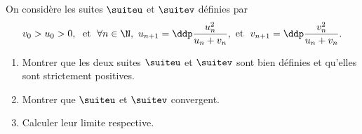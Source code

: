 \begin{exercice}
On consid\`ere les suites $\suiteu$ et $\suitev$ d\'efinies par
$$v_0>u_0>0, \; \textmd{ et } \; \forall n\in\N,\ u_{n+1}=\ddp\frac{u_n^2}{u_n+v_n}, \textmd{ et } \ v_{n+1}=\ddp\frac{v_n^2}{u_n+v_n}.$$
\begin{enumerate}
 \item
Montrer que les deux suites $\suiteu$ et $\suitev$ sont bien d\'efinies et qu'elles sont strictement positives. 
\item 
Montrer que $\suiteu$ et $\suitev$ convergent.
\item 
Calculer leur limite respective.

\end{enumerate}
\end{exercice}